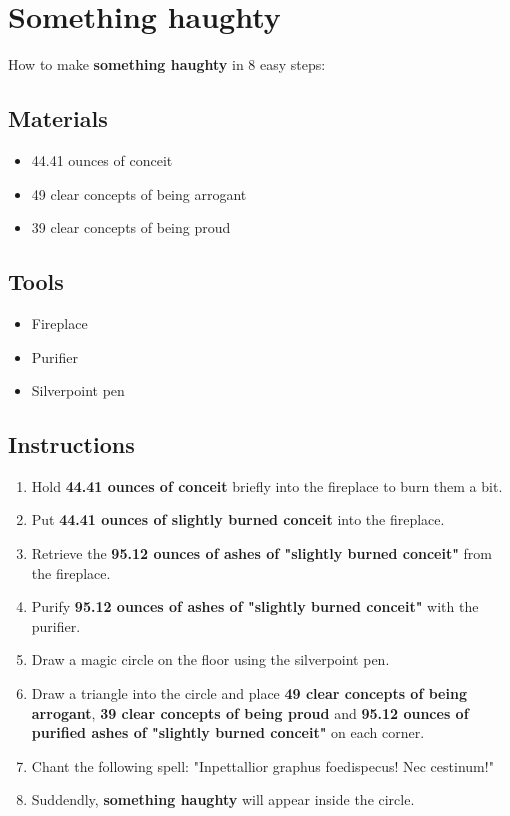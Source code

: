 \documentclass{article}
\begin{document}
\section{Something haughty}How to make \textbf{something haughty} in 8 easy steps:

\subsection{Materials}\begin{itemize}
\item 
44.41 ounces of conceit
\item 
49 clear concepts of being arrogant
\item 
39 clear concepts of being proud
\end{itemize}
\subsection{Tools}\begin{itemize}
\item 
Fireplace
\item 
Purifier
\item 
Silverpoint pen
\end{itemize}
\subsection{Instructions}\begin{enumerate}
\item 
Hold \textbf{44.41 ounces of conceit} briefly into the fireplace to burn them a bit.
\item 
Put \textbf{44.41 ounces of slightly burned conceit} into the fireplace.
\item 
Retrieve the \textbf{95.12 ounces of ashes of "slightly burned conceit"} from the fireplace.
\item 
Purify \textbf{95.12 ounces of ashes of "slightly burned conceit"} with the purifier.
\item 
Draw a magic circle on the floor using the silverpoint pen.
\item 
Draw a triangle into the circle and place \textbf{49 clear concepts of being arrogant}, \textbf{39 clear concepts of being proud} and \textbf{95.12 ounces of purified ashes of "slightly burned conceit"} on each corner.
\item 
Chant the following spell: "Inpettallior graphus foedispecus! Nec cestinum!"
\item 
Suddendly, \textbf{something haughty} will appear inside the circle.
\end{enumerate}
\newpage
\end{document}
